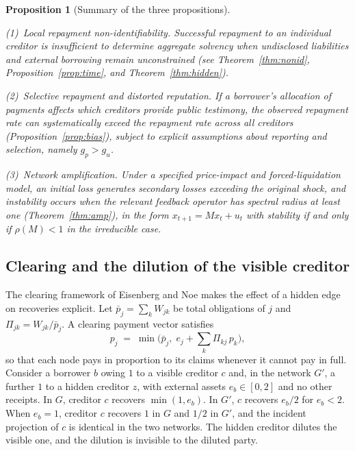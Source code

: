 \documentclass[11pt]{article}
\newtheorem{proposition}[theorem]{Proposition}
\theoremstyle{definition}
\theoremstyle{remark}
\begin{document}
\begin{proposition}[Summary of the three propositions]\label{prop:three}
\par\smallskip\noindent(1)~\emph{Local repayment non-identifiability.} Successful repayment to an individual creditor is insufficient to determine aggregate solvency when undisclosed liabilities and external borrowing remain unconstrained (see Theorem~\ref{thm:nonid}, Proposition~\ref{prop:time}, and Theorem~\ref{thm:hidden}).
\par\smallskip\noindent(2)~\emph{Selective repayment and distorted reputation.} If a borrower's allocation of payments affects which creditors provide public testimony, the observed repayment rate can systematically exceed the repayment rate across all creditors (Proposition~\ref{prop:bias}), subject to explicit assumptions about reporting and selection, namely $g_p>g_u$.
\par\smallskip\noindent(3)~\emph{Network amplification.} Under a specified price-impact and forced-liquidation model, an initial loss generates secondary losses exceeding the original shock, and instability occurs when the relevant feedback operator has spectral radius at least one (Theorem~\ref{thm:amp}), in the form $x_{t+1}=Mx_t+u_t$ with stability if and only if $\rho(M)<1$ in the irreducible case.
\end{proposition}

\subsection{Clearing and the dilution of the visible creditor}

The clearing framework of Eisenberg and Noe \cite{eisenberg2001} makes the effect of a hidden edge on recoveries explicit. Let $\bar p_j=\sum_kW_{jk}$ be total obligations of $j$ and $\Pi_{jk}=W_{jk}/\bar p_j$. A clearing payment vector satisfies
\[
p_j\;=\;\min\Big(\bar p_j,\;e_j+\sum_k\Pi_{kj}\,p_k\Big),
\]
so that each node pays in proportion to its claims whenever it cannot pay in full. Consider a borrower $b$ owing $1$ to a visible creditor $c$ and, in the network $G'$, a further $1$ to a hidden creditor $z$, with external assets $e_b\in[0,2]$ and no other receipts. In $G$, creditor $c$ recovers $\min(1,e_b)$. In $G'$, $c$ recovers $e_b/2$ for $e_b<2$. When $e_b=1$, creditor $c$ recovers $1$ in $G$ and $1/2$ in $G'$, and the incident projection of $c$ is identical in the two networks. The hidden creditor dilutes the visible one, and the dilution is invisible to the diluted party.
\end{document}
